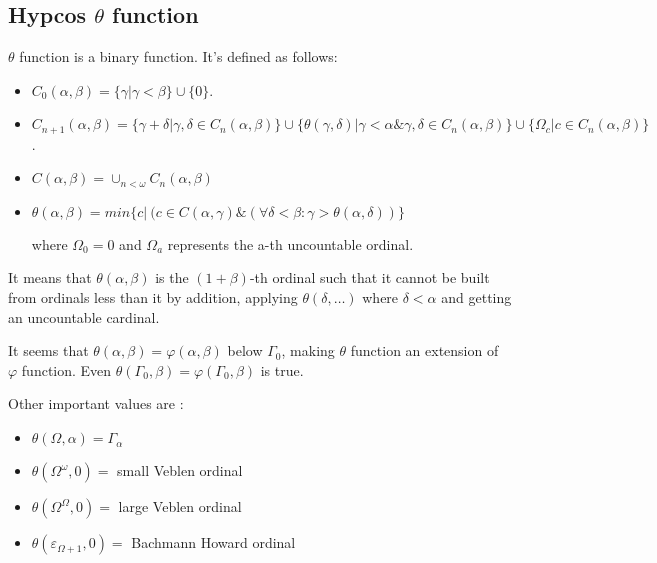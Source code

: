 \documentclass[10pt]{article}
\begin{document}
\subsection{Hypcos \( \theta \) function}

\( \theta  \) function is a binary function. It’s defined as follows:

\begin{itemize}

\item \( C_0(\alpha,\beta) = \lbrace \gamma|\gamma<\beta \rbrace \cup \lbrace 0 \rbrace \).

\item \( C_{n+1}(\alpha,\beta) = \lbrace \gamma+\delta|\gamma,\delta \in C_n(\alpha,\beta) \rbrace \cup \lbrace \theta(\gamma,\delta)|\gamma<\alpha \& \gamma,\delta \in C_n(\alpha,\beta) \rbrace \cup \lbrace \Omega_c|c \in C_n(\alpha,\beta) \rbrace \).

\item \( C(\alpha,\beta) = \cup_{n<\omega} C_n(\alpha,\beta) \)

\item \( \theta(\alpha,\beta) = min \lbrace c|~(c \in C(\alpha,\gamma) \& (\forall \delta<\beta:\gamma>\theta(\alpha,\delta)) \rbrace \)

where \( \Omega_0 = 0 \) and \( \Omega_a \) represents the a-th uncountable ordinal.

\end{itemize}

It means that \( \theta(\alpha,\beta) \) is the \( (1+\beta) \)-th ordinal such that it cannot be built from ordinals less than it by addition, applying \( \theta(\delta,\ldots) \) where \( \delta < \alpha \) and getting an uncountable cardinal.

It seems that \( \theta(\alpha,\beta) = \varphi(\alpha,\beta) \) below \( \Gamma_0 \), making \( \theta \) function an extension of \( \varphi \) function. Even \( \theta(\Gamma_0,\beta) = \varphi(\Gamma_0,\beta) \) is true.

\bigskip

Other important values are :

\begin{itemize}

\item \( \theta(\Omega,\alpha) = \Gamma_\alpha \)

\item \( \theta(\Omega^\omega,0) = \) small Veblen ordinal

\item \( \theta(\Omega^\Omega,0) = \) large Veblen ordinal

\item \( \theta(\varepsilon_{\Omega+1},0) = \) Bachmann Howard ordinal

\end{itemize}
\end{document}
